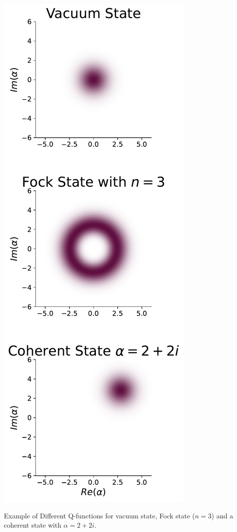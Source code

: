 \begin{marginfigure}[-12 cm]
    \centering
    \includegraphics{Figs/Theory/Q_functions.pdf}
    \caption{Example of Different Q-functions for vacuum state, Fock state ($n = 3$) and a coherent state with $\alpha = 2 + 2i$.}
    \label{fig:Q_func_examples}
\end{marginfigure}

